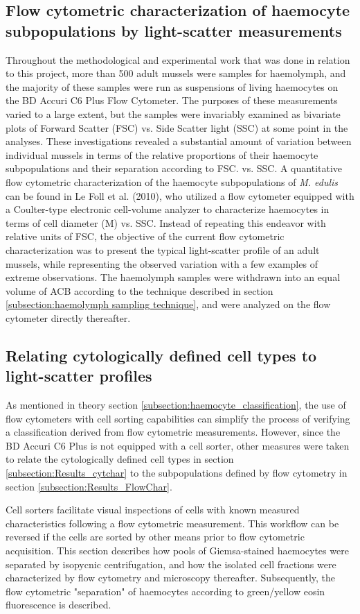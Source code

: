 \subsection{Flow cytometric characterization of haemocyte subpopulations by light-scatter measurements}
Throughout the methodological and experimental work that was done in relation to this project, more than 500 adult mussels were samples for haemolymph, and the majority of these samples were run as suspensions of living haemocytes on the BD Accuri C6 Plus Flow Cytometer. The purposes of these measurements varied to a large extent, but the samples were invariably examined as bivariate plots of Forward Scatter (FSC) vs. Side Scatter light (SSC) at some point in the analyses. These investigations revealed a substantial amount of variation between individual mussels in terms of the relative proportions of their haemocyte subpopulations and their separation according to FSC. vs. SSC. A quantitative flow cytometric characterization of the haemocyte subpopulations of \emph{M. edulis} can be found in Le Foll et al. (2010), who utilized a flow cytometer equipped with a Coulter-type electronic cell-volume analyzer to characterize haemocytes in terms of cell diameter (\micro M) vs. SSC. Instead of repeating this endeavor with relative units of FSC, the objective of the current flow cytometric characterization was to present the typical light-scatter profile of an adult mussels, while representing the observed variation with a few examples of extreme observations. The haemolymph samples were withdrawn into an equal volume of ACB according to the technique described in section \ref{subsection:haemolymph sampling technique}, and were analyzed on the flow cytometer directly thereafter.

\subsection{Relating cytologically defined cell types to light-scatter profiles}
As mentioned in theory section \ref{subsection:haemocyte_classification}, the use of flow cytometers with cell sorting capabilities can simplify the process of verifying a classification derived from flow cytometric measurements. However, since the BD Accuri C6 Plus is not equipped with a cell sorter, other measures were taken to relate the cytologically defined cell types in section \ref{subsection:Results_cytchar} to the subpopulations defined by flow cytometry in section \ref{subsection:Results_FlowChar}.

Cell sorters facilitate visual inspections of cells with known measured characteristics following a flow cytometric measurement. This workflow can be reversed if the cells are sorted by other means prior to flow cytometric acquisition. This section describes how pools of Giemsa-stained haemocytes were separated by isopycnic centrifugation, and how the isolated cell fractions were characterized by flow cytometry and microscopy thereafter. Subsequently, the flow cytometric "separation" of haemocytes according to green/yellow eosin fluorescence is described.

